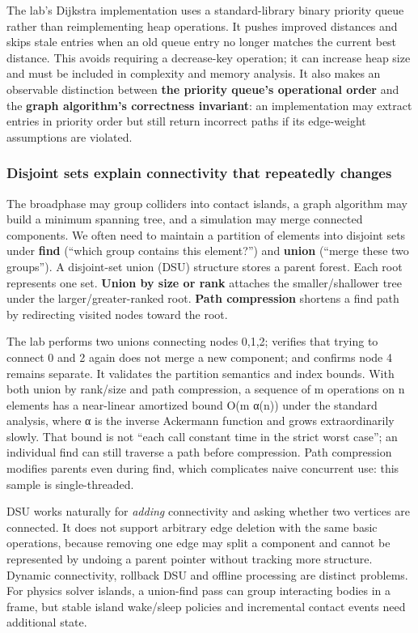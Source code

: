 The lab's Dijkstra implementation uses a standard-library binary priority queue rather than reimplementing heap operations. It pushes improved distances and skips stale entries when an old queue entry no longer matches the current best distance. This avoids requiring a decrease-key operation; it can increase heap size and must be included in complexity and memory analysis. It also makes an observable distinction between \textbf{the priority queue's operational order} and the \textbf{graph algorithm's correctness invariant}: an implementation may extract entries in priority order but still return incorrect paths if its edge-weight assumptions are violated.

\subsubsection{Disjoint sets explain connectivity that repeatedly changes}\label{disjoint-sets-explain-connectivity-that-repeatedly-changes}

The broadphase may group colliders into contact islands, a graph algorithm may build a minimum spanning tree, and a simulation may merge connected components. We often need to maintain a partition of elements into disjoint sets under \textbf{find} (``which group contains this element?'') and \textbf{union} (``merge these two groups''). A disjoint-set union (DSU) structure stores a parent forest. Each root represents one set. \textbf{Union by size or rank} attaches the smaller/shallower tree under the larger/greater-ranked root. \textbf{Path compression} shortens a find path by redirecting visited nodes toward the root.

The lab performs two unions connecting nodes 0,1,2; verifies that trying to connect 0 and 2 again does not merge a new component; and confirms node 4 remains separate. It validates the partition semantics and index bounds. With both union by rank/size and path compression, a sequence of m operations on n elements has a near-linear amortized bound O(m α(n)) under the standard analysis, where α is the inverse Ackermann function and grows extraordinarily slowly. That bound is not ``each call constant time in the strict worst case''; an individual find can still traverse a path before compression. Path compression modifies parents even during find, which complicates naive concurrent use: this sample is single-threaded.

DSU works naturally for \emph{adding} connectivity and asking whether two vertices are connected. It does not support arbitrary edge deletion with the same basic operations, because removing one edge may split a component and cannot be represented by undoing a parent pointer without tracking more structure. Dynamic connectivity, rollback DSU and offline processing are distinct problems. For physics solver islands, a union-find pass can group interacting bodies in a frame, but stable island wake/sleep policies and incremental contact events need additional state.

